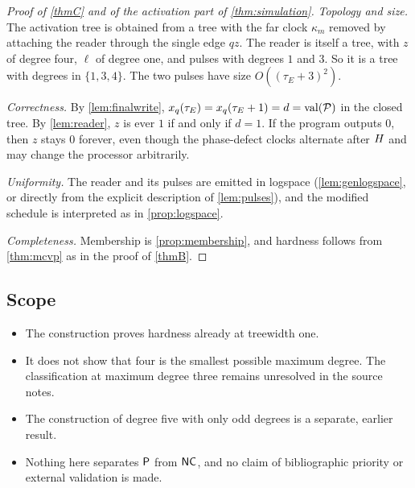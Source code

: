 \begin{proof}[Proof of \cref{thmC} and of the activation part of \cref{thm:simulation}]
\emph{Topology and size.} The activation tree is obtained from a tree with the far clock $\kappa_m$
removed by attaching the reader through the single edge $qz$. The reader is itself a tree, with
$z$ of degree four, $\ell$ of degree one, and pulses with degrees $1$ and $3$. So it is a tree with
degrees in $\{1,3,4\}$. The two pulses have size $O((\tau_E+3)^2)$.

\emph{Correctness.} By \cref{lem:finalwrite}, $x_q(\tau_E)=x_q(\tau_E+1)=d=\operatorname{val}(\mathcal P)$ in the
closed tree. By \cref{lem:reader}, $z$ is ever $1$ if and only if $d=1$. If the program outputs $0$,
then $z$ stays $0$ forever, even though the phase-defect clocks alternate after $H$ and may change
the processor arbitrarily.

\emph{Uniformity.} The reader and its pulses are emitted in logspace (\cref{lem:genlogspace}, or
directly from the explicit description of \cref{lem:pulses}), and the modified schedule is
interpreted as in \cref{prop:logspace}.

\emph{Completeness.} Membership is \cref{prop:membership}, and hardness follows from \cref{thm:mcvp}
as in the proof of \cref{thmB}.
\end{proof}

\subsection{Scope}

\begin{remark}\label{rem:scope}
\begin{itemize}
\item The construction proves hardness already at treewidth one.
\item It does not show that four is the smallest possible maximum degree. The classification at
  maximum degree three remains unresolved in the source notes.
\item The construction of degree five with only odd degrees is a separate, earlier result.
\item Nothing here separates $\mathsf{P}$ from $\mathsf{NC}$, and no claim of bibliographic priority or
  external validation is made.
\end{itemize}
\end{remark}
